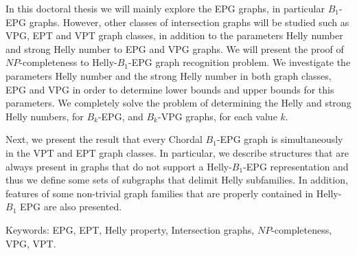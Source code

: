 \begin{foreignabstract}
In this doctoral thesis we will mainly explore the  EPG graphs, in particular $B_1$-EPG graphs. However, other classes of intersection graphs will be studied such as VPG, EPT and VPT graph classes, in addition to the parameters Helly number and strong Helly number to EPG and VPG graphs. We will present the proof of $NP$-completeness to Helly-$B_1$-EPG graph recognition problem. We investigate the parameters Helly number and the strong Helly number in both graph classes, EPG and VPG in order to determine lower bounds and upper bounds for this parameters. We completely solve the problem of determining the Helly and strong Helly numbers, for $B_k$-EPG, and $B_k$-VPG graphs, for each value $k$. 

Next, we present the result that every Chordal $B_1$-EPG graph is simultaneously in the VPT and EPT graph classes. In particular, we describe structures that are always present in graphs that do not support a Helly-$B_1$-EPG representation and thus we define some sets of subgraphs that delimit Helly subfamilies. 
 In addition, features of some non-trivial graph families that are properly contained in Helly-$B_1$ EPG are also presented.

Keywords: EPG, EPT, Helly property, Intersection graphs, $NP$-completeness, VPG, VPT.

\end{foreignabstract}

